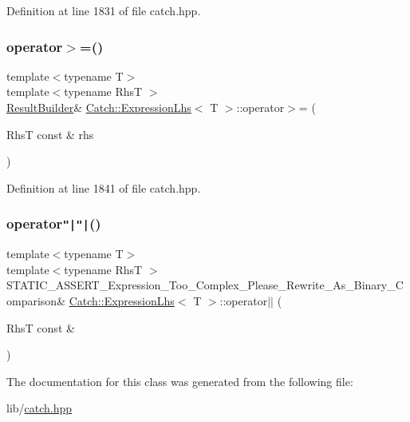 Definition at line 1831 of file catch.\+hpp.

\hypertarget{class_catch_1_1_expression_lhs_a21d30d6026ff2b1f86ddbd6b0a90d036}{}\label{class_catch_1_1_expression_lhs_a21d30d6026ff2b1f86ddbd6b0a90d036} 
\subsubsection{\texorpdfstring{operator$>$=()}{operator>=()}}
{\footnotesize\ttfamily template$<$typename T$>$ \\
template$<$typename RhsT $>$ \\
\hyperlink{class_catch_1_1_result_builder}{Result\+Builder}\& \hyperlink{class_catch_1_1_expression_lhs}{Catch\+::\+Expression\+Lhs}$<$ T $>$\+::operator$>$= (\begin{DoxyParamCaption}\item[{RhsT const \&}]{rhs }\end{DoxyParamCaption})\hspace{0.3cm}{\ttfamily [inline]}}



Definition at line 1841 of file catch.\+hpp.

\hypertarget{class_catch_1_1_expression_lhs_a6932b72da79d6c6b03d867772ceac61b}{}\label{class_catch_1_1_expression_lhs_a6932b72da79d6c6b03d867772ceac61b} 
\subsubsection{\texorpdfstring{operator\texttt{"|}\texttt{"|}()}{operator||()}}
{\footnotesize\ttfamily template$<$typename T$>$ \\
template$<$typename RhsT $>$ \\
S\+T\+A\+T\+I\+C\+\_\+\+A\+S\+S\+E\+R\+T\+\_\+\+Expression\+\_\+\+Too\+\_\+\+Complex\+\_\+\+Please\+\_\+\+Rewrite\+\_\+\+As\+\_\+\+Binary\+\_\+\+Comparison\& \hyperlink{class_catch_1_1_expression_lhs}{Catch\+::\+Expression\+Lhs}$<$ T $>$\+::operator$\vert$$\vert$ (\begin{DoxyParamCaption}\item[{RhsT const \&}]{ }\end{DoxyParamCaption})}



The documentation for this class was generated from the following file\+:\begin{DoxyCompactItemize}
\item 
lib/\hyperlink{catch_8hpp}{catch.\+hpp}\end{DoxyCompactItemize}
